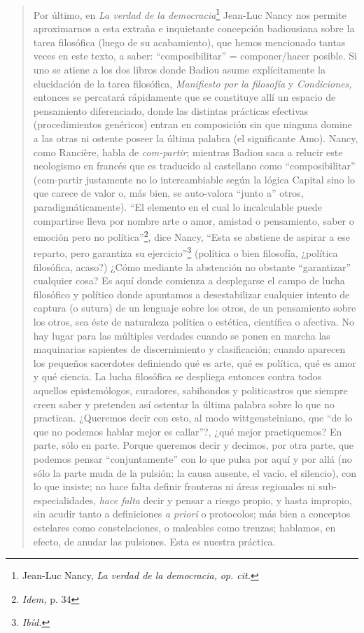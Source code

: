\begin{quote}
Por último, en \emph{La verdad de la democracia}\footnote{Jean-Luc Nancy, \emph{La verdad de la democracia,} \emph{op. cit.}} Jean-Luc Nancy nos permite aproximarnos a esta extraña e inquietante concepción badiousiana sobre la tarea filosófica (luego de su acabamiento), que hemos mencionado tantas veces en este texto, a saber: \enquote{composibilitar} = componer/hacer posible. Si uno se atiene a los dos libros donde Badiou asume explícitamente la elucidación de la tarea filosófica, \emph{Manifiesto por la filosofía} y \emph{Condiciones,} entonces se percatará rápidamente que se constituye allí un espacio de pensamiento diferenciado, donde las distintas prácticas efectivas (procedimientos genéricos) entran en composición sin que ninguna domine a las otras ni ostente poseer la última palabra (el significante Amo). Nancy, como Rancière, habla de \emph{com-partir}; mientras Badiou saca a relucir este neologismo en francés que es traducido al castellano como \enquote{composibilitar} (com-partir justamente no lo intercambiable según la lógica Capital sino lo que carece de valor o, más bien, se auto-valora \enquote{junto a} otros, paradigmáticamente). \enquote{El elemento en el cual lo incalculable puede compartirse lleva por nombre arte o amor, amistad o pensamiento, saber o emoción pero no política}\footnote{\emph{Idem,} p. 34}, dice Nancy, \enquote{Esta se abstiene de aspirar a ese reparto, pero garantiza su ejercicio}\footnote{\emph{Ibíd.}} (política o bien filosofía, ¿política filosófica, acaso?) ¿Cómo mediante la abstención no obstante \enquote{garantizar} cualquier cosa? Es aquí donde comienza a desplegarse el campo de lucha filosófico y político donde apuntamos a desestabilizar cualquier intento de captura (o sutura) de un lenguaje sobre los otros, de un pensamiento sobre los otros, sea éste de naturaleza política o estética, científica o afectiva. No hay lugar para las múltiples verdades cuando se ponen en marcha las maquinarias sapientes de discernimiento y clasificación; cuando aparecen los pequeños sacerdotes definiendo qué es arte, qué es política, qué es amor y qué ciencia. La lucha filosófica se despliega entonces contra todos aquellos epistemólogos, curadores, sabihondos y politicastros que siempre creen saber y pretenden así ostentar la última palabra sobre lo que no practican. ¿Queremos decir con esto, al modo wittgensteiniano, que \enquote{de lo que no podemos hablar mejor es callar}?, ¿qué mejor practiquemos? En parte, sólo en parte. Porque queremos decir y decimos, por otra parte, que podemos pensar \enquote{conjuntamente} con lo que pulsa por aquí y por allá (no sólo la parte muda de la pulsión: la causa ausente, el vacío, el silencio), con lo que insiste; no hace falta definir fronteras ni áreas regionales ni sub-especialidades, \emph{hace falta} decir y pensar a riesgo propio, y hasta impropio, sin acudir tanto a definiciones \emph{a priori} o protocolos; más bien a conceptos estelares como constelaciones, o maleables como trenzas; hablamos, en efecto, de anudar las pulsiones. Esta es nuestra práctica.


\end{quote}

